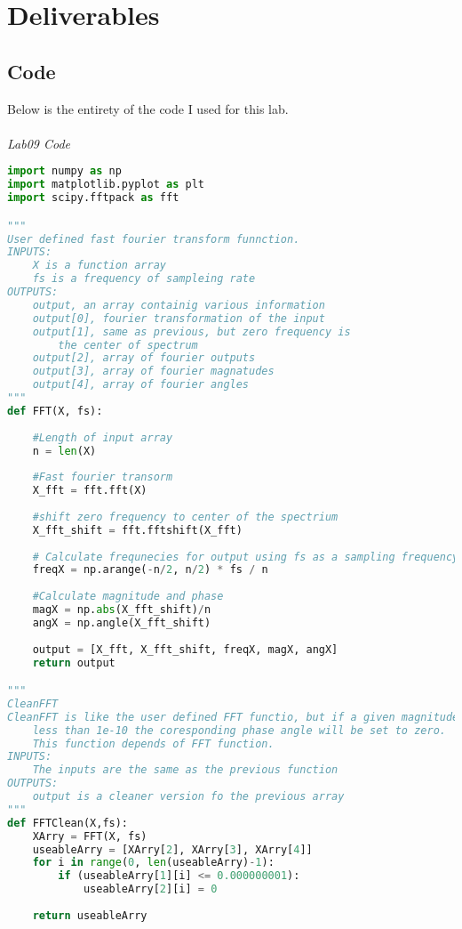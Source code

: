 \documentclass[12pt,a4paper]{article}
\begin{document}
\section{Deliverables}
\subsection{Code}
Below is the entirety of the code I used for this lab.\\
\\
\textit{Lab09 Code}
\begin{lstlisting}[language=Python]
import numpy as np
import matplotlib.pyplot as plt
import scipy.fftpack as fft

"""
User defined fast fourier transform funnction.
INPUTS:
    X is a function array
    fs is a frequency of sampleing rate
OUTPUTS:
    output, an array containig various information
    output[0], fourier transformation of the input
    output[1], same as previous, but zero frequency is 
        the center of spectrum
    output[2], array of fourier outputs
    output[3], array of fourier magnatudes
    output[4], array of fourier angles
"""
def FFT(X, fs):
    
    #Length of input array
    n = len(X)
    
    #Fast fourier transorm
    X_fft = fft.fft(X)
        
    #shift zero frequency to center of the spectrium
    X_fft_shift = fft.fftshift(X_fft)
    
    # Calculate frequnecies for output using fs as a sampling frequency
    freqX = np.arange(-n/2, n/2) * fs / n
    
    #Calculate magnitude and phase
    magX = np.abs(X_fft_shift)/n
    angX = np.angle(X_fft_shift)
    
    output = [X_fft, X_fft_shift, freqX, magX, angX]    
    return output

"""
CleanFFT
CleanFFT is like the user defined FFT functio, but if a given magnitude is
    less than 1e-10 the coresponding phase angle will be set to zero.
    This function depends of FFT function.
INPUTS:
    The inputs are the same as the previous function
OUTPUTS:
    output is a cleaner version fo the previous array
"""
def FFTClean(X,fs):
    XArry = FFT(X, fs)
    useableArry = [XArry[2], XArry[3], XArry[4]]
    for i in range(0, len(useableArry)-1):
        if (useableArry[1][i] <= 0.000000001):
            useableArry[2][i] = 0
    
    return useableArry



\end{lstlisting}
\end{document}
